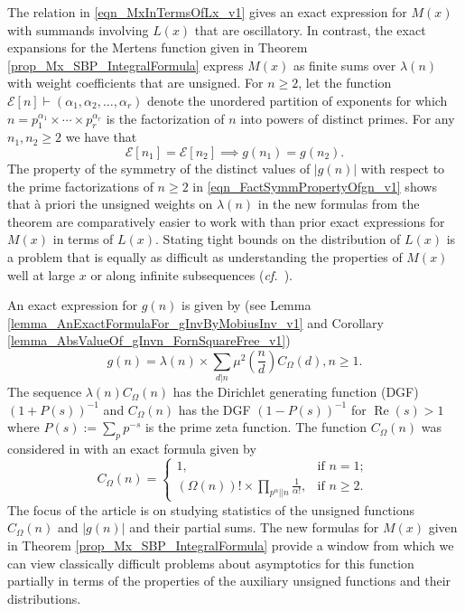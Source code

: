 \documentclass[11pt,reqno,a4letter]{article}
\newcommand{\hlocalref}[1]{\hyperref[#1]{\ref{#1}}}
\numberwithin{equation}{section}
\numberwithin{figure}{section}
\numberwithin{table}{section}
\newcommand{\cf}{\textit{cf.\ }}
\theoremstyle{plain}
\numberwithin{theorem}{section}
\theoremstyle{definition}
\renewcommand{\Re}{\operatorname{Re}}
\begin{document}
The relation in \eqref{eqn_MxInTermsOfLx_v1} 
gives an exact expression for $M(x)$ with summands involving $L(x)$ that are oscillatory. 
In contrast, the exact expansions for the Mertens function given in 
Theorem \hlocalref{prop_Mx_SBP_IntegralFormula} 
express $M(x)$ as finite sums over $\lambda(n)$ with weight coefficients that are unsigned. 
For $n \geq 2$, let the function 
$\mathcal{E}[n] \vdash (\alpha_1, \alpha_2, \ldots, \alpha_r)$ denote the unordered 
partition of exponents for which 
$n = p_1^{\alpha_1} \times \cdots \times p_r^{\alpha_r}$ is the factorization of 
$n$ into powers of distinct primes. 
For any $n_1,n_2 \geq 2$ we have that 
\begin{equation}
\label{eqn_FactSymmPropertyOfgn_v1} 
\mathcal{E}[n_1] = \mathcal{E}[n_2] \implies g(n_1) = g(n_2). 
\end{equation}
The property of the symmetry of the distinct values of $|g(n)|$ with respect to the 
prime factorizations of $n \geq 2$ in \eqref{eqn_FactSymmPropertyOfgn_v1} 
shows that \`{a} priori the unsigned weights on $\lambda(n)$ in 
the new formulas from the theorem are comparatively easier to work with than prior 
exact expressions for $M(x)$ in terms of $L(x)$. 
Stating tight bounds on the distribution of 
$L(x)$ is a problem that is equally as difficult 
as understanding the properties of $M(x)$ well at large $x$ or 
along infinite subsequences (\cf \cite{MR2877066,MR3779960}). 

An exact expression for $g(n)$ is given by 
(see Lemma \hlocalref{lemma_AnExactFormulaFor_gInvByMobiusInv_v1} and 
Corollary \hlocalref{lemma_AbsValueOf_gInvn_FornSquareFree_v1}) 
\begin{equation}
\label{eqn_gInvn_ExactDivisorSumFormula_WithSgnWeight_v1} 
g(n) = \lambda(n) \times \sum_{d|n} \mu^2\left(\frac{n}{d}\right) C_{\Omega}(d), n \geq 1. 
\end{equation}
The sequence $\lambda(n) C_{\Omega}(n)$ has the 
Dirichlet generating function (DGF) $(1 + P(s))^{-1}$ and 
$C_{\Omega}(n)$ has the DGF $(1-P(s))^{-1}$ for $\Re(s) > 1$ 
where $P(s) := \sum_p p^{-s}$ is the prime zeta function. 
The function $C_{\Omega}(n)$ was considered in 
\cite{FROBERG-1968} with an exact formula given by 
\begin{equation}
\label{eqn_proof_tag_hInvn_ExactNestedSumFormula_CombInterpetIdent_v3}
C_{\Omega}(n) = \begin{cases}
     1, & \text{if $n = 1$; } \\ 
     (\Omega(n))! \times \prod\limits_{p^{\alpha}||n} \frac{1}{\alpha!}, & \text{if $n \geq 2$. }
     \end{cases}
\end{equation} 
The focus of the article is on studying statistics of the unsigned functions 
$C_{\Omega}(n)$ and $|g(n)|$ and their partial sums. 
The new formulas for $M(x)$ given in 
Theorem \hlocalref{prop_Mx_SBP_IntegralFormula} 
provide a window from which we can view classically  
difficult problems about asymptotics for this function partially in terms of the 
properties of the auxiliary unsigned functions and their distributions. 
\end{document}
